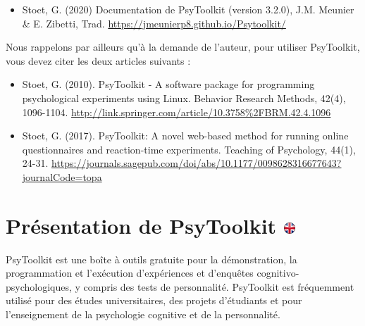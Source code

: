 \documentclass[
]{book}
\providecommand{\tightlist}{%
  \setlength{\itemsep}{0pt}\setlength{\parskip}{0pt}}
\begin{document}
\begin{itemize}
\tightlist
\item
  Stoet, G. (2020) Documentation de PsyToolkit (version 3.2.0), J.M. Meunier \& E. Zibetti, Trad. \url{https://jmeunierp8.github.io/Psytoolkit/}
\end{itemize}

Nous rappelons par ailleurs qu'à la demande de l'auteur, pour utiliser PsyToolkit, vous devez citer les deux articles suivants :

\begin{itemize}
\item
  Stoet, G. (2010). PsyToolkit - A software package for programming psychological experiments using Linux. Behavior Research Methods, 42(4), 1096-1104. \url{http://link.springer.com/article/10.3758\%2FBRM.42.4.1096}
\item
  Stoet, G. (2017). PsyToolkit: A novel web-based method for running online questionnaires and reaction-time experiments. Teaching of Psychology, 44(1), 24-31. \url{https://journals.sagepub.com/doi/abs/10.1177/0098628316677643?journalCode=topa}
\end{itemize}

\hypertarget{pruxe9sentation-de-psytoolkit}{%
\chapter[Présentation de PsyToolkit ]{\texorpdfstring{Présentation de PsyToolkit \href{https://www.psytoolkit.org/\#_about_psytoolkit}{\protect\includegraphics{img/ukflag.png}}}{Présentation de PsyToolkit }}\label{pruxe9sentation-de-psytoolkit}}

PsyToolkit est une boîte à outils gratuite pour la démonstration, la programmation et l'exécution d'expériences et d'enquêtes cognitivo-psychologiques, y compris des tests de personnalité. PsyToolkit est fréquemment utilisé pour des études universitaires, des projets d'étudiants et pour l'enseignement de la psychologie cognitive et de la personnalité.
\end{document}
